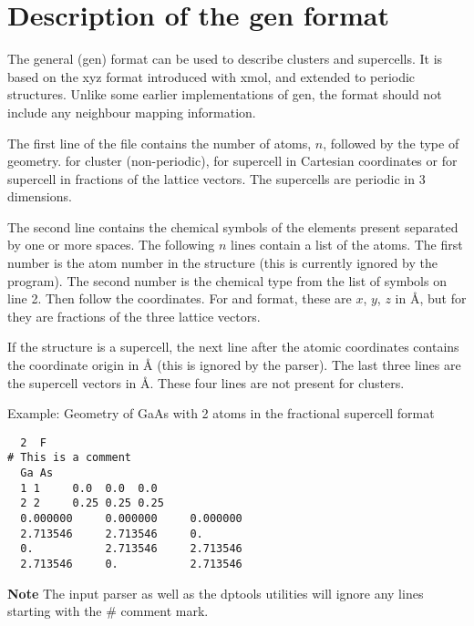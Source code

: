 
\chapter{Description of the gen format}
\label{app:gen}

The general (gen) format can be used to describe clusters and
supercells. It is based on the xyz format introduced with xmol, and
extended to periodic structures. Unlike some earlier implementations
of gen, the format should not include any neighbour mapping
information.

The first line of the file contains the number of atoms, $n$, followed
by the type of geometry.  for cluster (non-periodic),  for
supercell in Cartesian coordinates or  for supercell in
fractions of the lattice vectors. The supercells are periodic in 3
dimensions.

The second line contains the chemical symbols of the elements present
separated by one or more spaces.  The following $n$ lines contain a
list of the atoms. The first number is the atom number in the
structure (this is currently ignored by the program). The second
number is the chemical type from the list of symbols on line 2. Then
follow the coordinates. For  and  format, these are $x$,
$y$, $z$ in {\AA}, but for  they are fractions of the three
lattice vectors.

If the structure is a supercell, the next line after the atomic
coordinates contains the coordinate origin in {\AA} (this is ignored
by the parser). The last three lines are the supercell vectors in
{\AA}. These four lines are not present for clusters.

Example: Geometry of GaAs with 2 atoms in the fractional supercell
format
\begin{verbatim}
  2  F
# This is a comment
  Ga As
  1 1     0.0  0.0  0.0
  2 2     0.25 0.25 0.25
  0.000000     0.000000     0.000000
  2.713546     2.713546     0.      
  0.           2.713546     2.713546
  2.713546     0.           2.713546
\end{verbatim}

{\bf Note} The \dftbp{} input parser as well as the dptools utilities will
ignore any lines starting with the \# comment mark.
